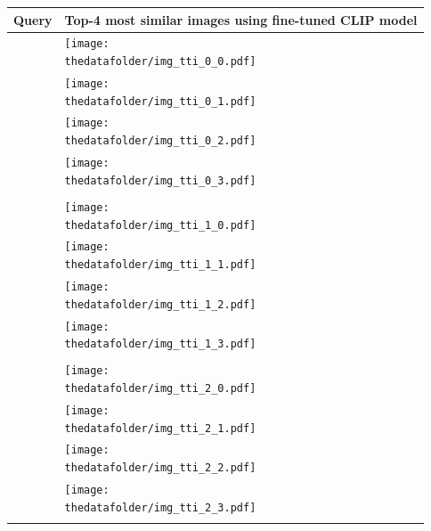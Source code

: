 \documentclass[10pt]{article} %
\begin{document}
\begin{table}[h!]
  \centering
  \begin{tabular}{m{3cm} p{3cm} p{3cm} p{3cm} p{3cm}}
      \toprule
      \centering \bfseries Query & \multicolumn{4}{c}{\bfseries{Top-4 most similar images using \textcolor{deepred}{fine-tuned CLIP model}}} \tabularnewline
      \midrule
       \texttt{} \vspace{20mm} & \centering \texttt{[image: \\thedatafolder/img\_tti\_0\_0.pdf]} \\  & \centering \texttt{[image: \\thedatafolder/img\_tti\_0\_1.pdf]} \\  & \centering \texttt{[image: \\thedatafolder/img\_tti\_0\_2.pdf]} \\  & \centering \texttt{[image: \\thedatafolder/img\_tti\_0\_3.pdf]} \\   \tabularnewline
      \midrule
      \texttt{} \vspace{20mm} & \centering \texttt{[image: \\thedatafolder/img\_tti\_1\_0.pdf]} \\  & \centering \texttt{[image: \\thedatafolder/img\_tti\_1\_1.pdf]} \\  & \centering \texttt{[image: \\thedatafolder/img\_tti\_1\_2.pdf]} \\  & \centering \texttt{[image: \\thedatafolder/img\_tti\_1\_3.pdf]} \\   \tabularnewline
      \midrule
      \texttt{} \vspace{20mm} & \centering \texttt{[image: \\thedatafolder/img\_tti\_2\_0.pdf]} \\  & \centering \texttt{[image: \\thedatafolder/img\_tti\_2\_1.pdf]} \\  & \centering \texttt{[image: \\thedatafolder/img\_tti\_2\_2.pdf]} \\  & \centering \texttt{[image: \\thedatafolder/img\_tti\_2\_3.pdf]} \\   \tabularnewline

\end{tabular}
\end{table}
\end{document}
